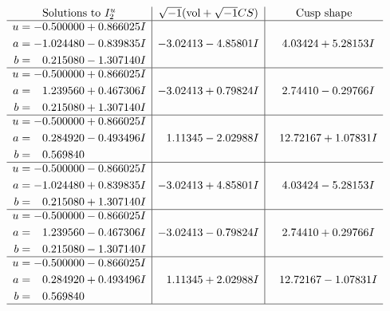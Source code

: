 \documentclass[1p]{elsarticle_modified}
\theoremstyle{definition}
\newcommand{\I}{\sqrt{-1}}
\begin{document}
$$\begin{array}{c|c|c}  
\text{Solutions to }I^u_{2}& \I (\text{vol} + \sqrt{-1}CS) & \text{Cusp shape}\\
 \hline 
\begin{aligned}
u &= -0.500000 + 0.866025 I \\
a &= -1.024480 - 0.839835 I \\
b &= \phantom{-}0.215080 - 1.307140 I\end{aligned}
 & -3.02413 - 4.85801 I & \phantom{-}4.03424 + 5.28153 I \\ \hline\begin{aligned}
u &= -0.500000 + 0.866025 I \\
a &= \phantom{-}1.239560 + 0.467306 I \\
b &= \phantom{-}0.215080 + 1.307140 I\end{aligned}
 & -3.02413 + 0.79824 I & \phantom{-}2.74410 - 0.29766 I \\ \hline\begin{aligned}
u &= -0.500000 + 0.866025 I \\
a &= \phantom{-}0.284920 - 0.493496 I \\
b &= \phantom{-}0.569840\phantom{ +0.000000I}\end{aligned}
 & \phantom{-}1.11345 - 2.02988 I & \phantom{-}12.72167 + 1.07831 I \\ \hline\begin{aligned}
u &= -0.500000 - 0.866025 I \\
a &= -1.024480 + 0.839835 I \\
b &= \phantom{-}0.215080 + 1.307140 I\end{aligned}
 & -3.02413 + 4.85801 I & \phantom{-}4.03424 - 5.28153 I \\ \hline\begin{aligned}
u &= -0.500000 - 0.866025 I \\
a &= \phantom{-}1.239560 - 0.467306 I \\
b &= \phantom{-}0.215080 - 1.307140 I\end{aligned}
 & -3.02413 - 0.79824 I & \phantom{-}2.74410 + 0.29766 I \\ \hline\begin{aligned}
u &= -0.500000 - 0.866025 I \\
a &= \phantom{-}0.284920 + 0.493496 I \\
b &= \phantom{-}0.569840\phantom{ +0.000000I}\end{aligned}
 & \phantom{-}1.11345 + 2.02988 I & \phantom{-}12.72167 - 1.07831 I\\
 \hline 
 \end{array}$$\newpage
\end{document}
